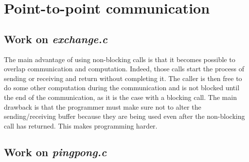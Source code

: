 \chapter{Point-to-point communication}

\section{Work on \textit{exchange.c}}

The main advantage of using non-blocking calls is that it becomes possible to overlap communication and computation. Indeed, those calls start the process of sending or receiving and return without completing it. The caller is then free to do some other computation during the communication and is not blocked until the end of the communication, as it is the case with a blocking call. The main drawback is that the programmer must make sure not to alter the sending/receiving buffer because they are being used even after the non-blocking call has returned. This makes programming harder.

\section{Work on \textit{pingpong.c}}
